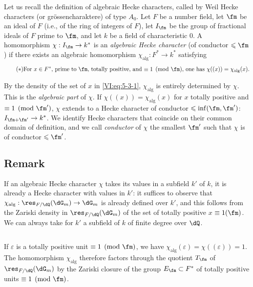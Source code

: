Let us recall the definition of algebraic Hecke characters, called by Weil 
Hecke characters (or gr\"ossencharaktere) of type $A_0$. Let $F$ be 
a number field, let $\fm$ be an ideal of $F$ (i.e., of the ring of integers of 
$F$), let $I_\fm$ be the group of fractional ideals of $F$ prime to $\fm$, 
and let $k$ be a field of characteristic $0$. A homomorphism 
$\chi:I_\fm \to k^\ast$ is an \emph{algebraic Hecke character} (of 
conductor $\leqslant \fm$) if there exists an algebraic homomorphism 
$\chi_\text{alg}:F^\ast \to k^\ast$ satisfying 
\begin{equation*}\tag{$*$}\label{VI:eq:5-3-1}
\text{For $x\in F^\ast$, prime to $\fm$, totally positive, and 
$\equiv 1\pmod\fm$, one has $\chi((x))=\chi_\text{alg}(x)$.}
\end{equation*}

By the density of the set of $x$ in \eqref{VI:eq:5-3-1}, $\chi_\text{alg}$ 
is entirely determined by $\chi$. This is the \emph{algebraic part} 
of $\chi$. If $\chi((x))=\chi_\text{alg}(x)$ for $x$ totally positive and 
$\equiv 1\pmod{\fm'}$, $\chi$ extends to a Hecke character of 
conductor $\leqslant \inf(\fm,\fm')$: $I_{\fm+\fm'}\to k^\ast$. We 
identify Hecke characters that coincide on their common domain of 
definition, and we call \emph{conductor} of $\chi$ the smallest $\fm'$ 
such that $\chi$ is of conductor $\leqslant \fm'$. 





\subsection{Remark}\label{VI:5-4}

If an algebraic Hecke character $\chi$ takes its values in a 
subfield $k'$ of $k$, it is already a Hecke character with values in 
$k'$: it suffices to observe that $\chi_\text{alg}:\res_{F/\dQ}(\dG_m) \to \dG_m$ 
is already defined over $k'$, and this follows from the Zariski density 
in $\res_{F/\dQ}(\dG_m)$ of the set of totally positive $x$ 
$\equiv 1(\fm)$. We can always take for $k'$ a subfield of $k$ of 
finite degree over $\dQ$. 





\subsection{}\label{VI:5-5}

If $\varepsilon$ is a totally positive unit $\equiv 1\pmod\fm$, we have 
$\chi_\text{alg}(\varepsilon) = \chi((\varepsilon)) = 1$. The homomorphism 
$\chi_\text{alg}$ therefore factors through the quotient $T_\fm$ of 
$\res_{F/\dQ}(\dG_m)$ by the Zariski closure of the group 
$E_\fm\subset F^\ast$ of totally positive units $\equiv 1\pmod\fm$. 

